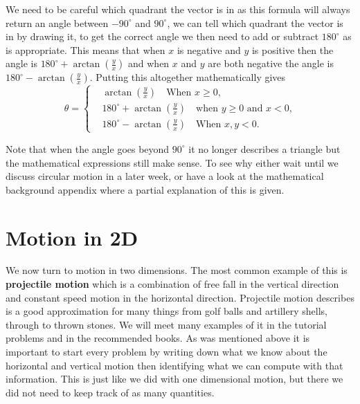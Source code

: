 We need to be careful which quadrant the vector is in as this formula will always return an angle between $-90^{\circ}$ and $90^{\circ}$, we can tell which quadrant the vector is in by drawing it, to get the correct angle we then need to add or subtract $180^{\circ}$ as is appropriate. This means that when $x$ is negative and $y$ is positive then the angle is $180^{\circ}+\arctan\left(\frac{y}{x}\right)$ and when $x$ and $y$ are both negative the angle is $180^{\circ}-\arctan\left(\frac{y}{x}\right)$. Putting this altogether mathematically gives
\begin{equation*}
    \theta =\begin{cases}
        &\arctan\left(\frac{y}{x}\right) \quad \text{When $x\geq 0$,}\\
        &180^{\circ}+\arctan\left(\frac{y}{x}\right)\quad \text{when $y\geq 0$ and $x<0$,}\\
        &180^{\circ}-\arctan\left(\frac{y}{x}\right) \quad \text{When $x,y <0$.}
    \end{cases}
\end{equation*}

Note that when the angle goes beyond $90^{\circ}$ it no longer describes a triangle but the mathematical expressions still make sense. To see why either wait until we discuss circular motion in a later week, or have a look at the mathematical background appendix where a partial explanation of this is given.


\section{Motion in 2D}
We now turn to motion in two dimensions. The most common example of this is \textbf{projectile motion} which is a combination of free fall in the vertical direction and constant speed motion in the horizontal direction.  Projectile motion describes is a good approximation for many things from golf balls and artillery shells, through to thrown stones. We will meet many examples of it in the tutorial problems and in the recommended books. As was mentioned above it is important to start every problem by writing down what we know about the horizontal and vertical motion then identifying what we can compute with that information. This is just like we did with one dimensional motion, but there we did not need to keep track of as many quantities.


